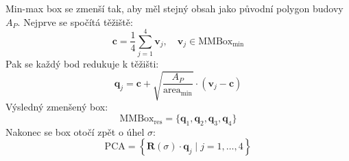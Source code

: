 Min-max box se zmenší tak, aby měl stejný obsah jako původní polygon budovy\( A_P \). Nejprve se spočítá těžiště:
\[
\mathbf{c} = \frac{1}{4} \sum_{j=1}^4 \mathbf{v}_j, \quad \mathbf{v}_j \in \text{MMBox}_{\min}
\]
Pak se každý bod redukuje k těžišti:
\begin{equation}
    \mathbf{q}_j = \mathbf{c} + \sqrt{\frac{A_P}{\text{area}_{\min}}} \cdot (\mathbf{v}_j - \mathbf{c})
\end{equation}
Výsledný zmenšený box:
\[
\text{MMBox}_{\text{res}} = \{ \mathbf{q}_1, \mathbf{q}_2, \mathbf{q}_3, \mathbf{q}_4 \}
\]
Nakonec se box otočí zpět o úhel \( \sigma \):
\begin{equation}
    \text{PCA} = \left\{ \mathbf{R}(\sigma) \cdot \mathbf{q}_j \mid j = 1,\dots,4 \right\}
\end{equation}



